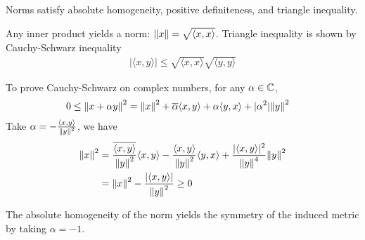 \documentclass[12pt,class=article,crop=false]{standalone}
\begin{document}
Norms satisfy absolute homogeneity, positive definiteness, and triangle inequality.

Any inner product yields a norm: $ {\left\lVert{ x}\right\rVert} = \sqrt{ \langle x,x \rangle} $. Triangle inequality is shown by Cauchy-Schwarz inequality
\begin{align*}
	|\langle x,y \rangle| \leq \sqrt{\langle x,x \rangle} \sqrt{  \langle y,y \rangle}
\end{align*}

To prove Cauchy-Schwarz on complex numbers, for any $ \alpha \in \mathbb{C}$,
\begin{align*}
	0 \leq {\left\lVert{ x+ \alpha y}\right\rVert}^2 &= {\left\lVert{ x}\right\rVert}^2+ \overline{ \alpha} \langle x,y \rangle + \alpha \langle y,x \rangle + | \alpha^2| {\left\lVert{ y}\right\rVert}^2
\end{align*}
Take $ \alpha = - \frac{\langle x,y \rangle}{ {\left\lVert{ y}\right\rVert}^2 }$, we have
\begin{align*}
	{\left\lVert{ x}\right\rVert}^2 &= \frac{\overline{ \langle x,y \rangle}}{ {\left\lVert{ y}\right\rVert}^2  } \langle x,y \rangle - \frac{\langle x,y \rangle}{ {\left\lVert{ y}\right\rVert}^2 } \langle y,x \rangle + \frac{|\langle x,y \rangle|^2}{ {\left\lVert{ y}\right\rVert}^{4} } {\left\lVert{ y}\right\rVert}^2\\
	&= {\left\lVert{ x}\right\rVert}^2 - \frac{|\langle x,y \rangle|}{ {\left\lVert{ y}\right\rVert}^2 } \geq 0 
\end{align*}

\begin{remark}
The absolute homogeneity of the norm yields the symmetry of the induced metric by taking $ \alpha =-1$.
\end{remark}
\end{document}
